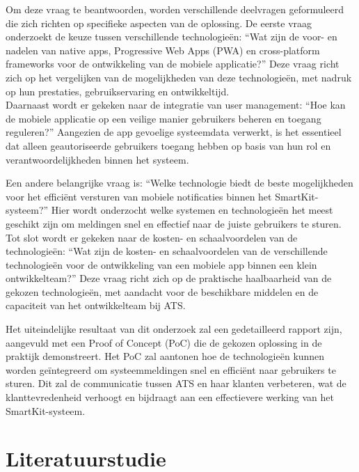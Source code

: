 \noindent Om deze vraag te beantwoorden, worden verschillende deelvragen geformuleerd die zich richten op specifieke aspecten van de oplossing. De eerste vraag onderzoekt de keuze tussen verschillende technologieën: “Wat zijn de voor- en nadelen van native apps, Progressive Web Apps (PWA) en cross-platform frameworks voor de ontwikkeling van de mobiele applicatie?” Deze vraag richt zich op het vergelijken van de mogelijkheden van deze technologieën, met nadruk op hun prestaties, gebruikservaring en ontwikkeltijd.\\

\noindent Daarnaast wordt er gekeken naar de integratie van user management: “Hoe kan de mobiele applicatie op een veilige manier gebruikers beheren en toegang reguleren?” Aangezien de app gevoelige systeemdata verwerkt, is het essentieel dat alleen geautoriseerde gebruikers toegang hebben op basis van hun rol en verantwoordelijkheden binnen het systeem.

\noindent Een andere belangrijke vraag is: “Welke technologie biedt de beste mogelijkheden voor het efficiënt versturen van mobiele notificaties binnen het SmartKit-systeem?” Hier wordt onderzocht welke systemen en technologieën het meest geschikt zijn om meldingen snel en effectief naar de juiste gebruikers te sturen.\\

\noindent Tot slot wordt er gekeken naar de kosten- en schaalvoordelen van de technologieën: “Wat zijn de kosten- en schaalvoordelen van de verschillende technologieën voor de ontwikkeling van een mobiele app binnen een klein ontwikkelteam?” Deze vraag richt zich op de praktische haalbaarheid van de gekozen technologieën, met aandacht voor de beschikbare middelen en de capaciteit van het ontwikkelteam bij ATS.

\noindent Het uiteindelijke resultaat van dit onderzoek zal een gedetailleerd rapport zijn, aangevuld met een Proof of Concept (PoC) die de gekozen oplossing in de praktijk demonstreert. Het PoC zal aantonen hoe de technologieën kunnen worden geïntegreerd om systeemmeldingen snel en efficiënt naar gebruikers te sturen. Dit zal de communicatie tussen ATS en haar klanten verbeteren, wat de klanttevredenheid verhoogt en bijdraagt aan een effectievere werking van het SmartKit-systeem.


\section{Literatuurstudie}%

